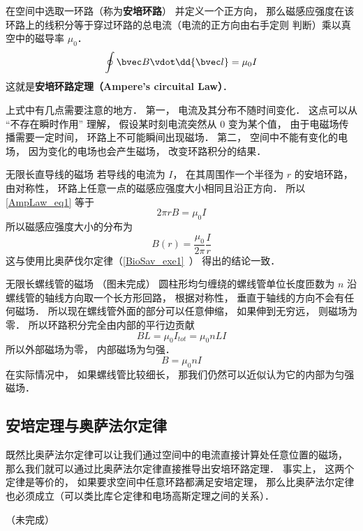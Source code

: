 
\begin{issues}
\end{issues}

在空间中选取一环路（称为\textbf{安培环路}） 并定义一个正方向， 那么磁感应强度在该环路上的线积分等于穿过环路的总电流（电流的正方向由右手定则 判断）乘以真空中的磁导率 $\mu_0$．
\begin{equation}\label{AmpLaw_eq1}
\oint \bvec B \vdot \dd{\bvec l} = \mu_0 I
\end{equation}
这就是\textbf{安培环路定理（Ampere's circuital Law）}．

上式中有几点需要注意的地方． 第一， 电流及其分布不随时间变化． 这点可以从 “不存在瞬时作用” 理解， 假设某时刻电流突然从 0 变为某个值， 由于电磁场传播需要一定时间， 环路上不可能瞬间出现磁场． 第二， 空间中不能有变化的电场， 因为变化的电场也会产生磁场， 改变环路积分的结果．%

\begin{example}{无限长直导线的磁场}\label{AmpLaw_ex1}
若导线的电流为 $I$， 在其周围作一个半径为 $r$ 的安培环路， 由对称性， 环路上任意一点的磁感应强度大小相同且沿正方向． 所以\autoref{AmpLaw_eq1} 等于
\begin{equation}
2\pi r B = \mu_0 I
\end{equation}
所以磁感应强度大小的分布为
\begin{equation}
B(r) = \frac{\mu_0}{2\pi} \frac Ir
\end{equation}
这与使用比奥萨伐尔定律（\autoref{BioSav_exe1}~） 得出的结论一致．
\end{example}

\begin{example}{无限长螺线管的磁场}\label{AmpLaw_ex2}
（图未完成） 
圆柱形均匀缠绕的螺线管单位长度匝数为 $n$ 沿螺线管的轴线方向取一个长方形回路， 根据对称性， 垂直于轴线的方向不会有任何磁场． 所以现在螺线管外面的部分可以任意伸缩， 如果伸到无穷远， 则磁场为零． 所以环路积分完全由内部的平行边贡献
\begin{equation}
BL = \mu_0 I_{tot} = \mu_0 nLI
\end{equation}
所以外部磁场为零， 内部磁场为匀强．
\begin{equation}
B = \mu_0 nI
\end{equation}
在实际情况中， 如果螺线管比较细长， 那我们仍然可以近似认为它的内部为匀强磁场．
\end{example}


\subsection{安培定理与奥萨法尔定律}
既然比奥萨法尔定律可以让我们通过空间中的电流直接计算处任意位置的磁场， 那么我们就可以通过比奥萨法尔定律直接推导出安培环路定理． 事实上， 这两个定律是等价的， 如果要求空间中任意环路都满足安培定理， 那么比奥萨法尔定律也必须成立（可以类比库仑定律和电场高斯定理之间的关系）．%


（未完成）
